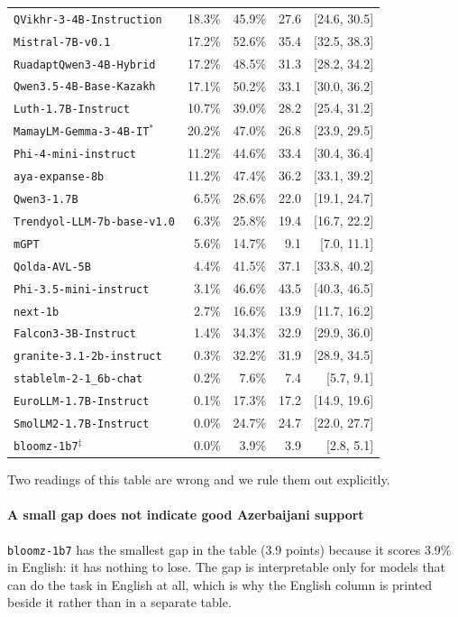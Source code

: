 \documentclass[final]{clv2025}
\begin{document}
\begin{table}[h!]
\begin{tabular}{lrrrr}
\texttt{QVikhr-3-4B-Instruction} & 18.3\% & 45.9\% & 27.6 & [24.6, 30.5] \\
\texttt{Mistral-7B-v0.1} & 17.2\% & 52.6\% & 35.4 & [32.5, 38.3] \\
\texttt{RuadaptQwen3-4B-Hybrid} & 17.2\% & 48.5\% & 31.3 & [28.2, 34.2] \\
\texttt{Qwen3.5-4B-Base-Kazakh} & 17.1\% & 50.2\% & 33.1 & [30.0, 36.2] \\
\texttt{Luth-1.7B-Instruct} & 10.7\% & 39.0\% & 28.2 & [25.4, 31.2] \\
\texttt{MamayLM-Gemma-3-4B-IT}$^{*}$ & 20.2\% & 47.0\% & 26.8 & [23.9, 29.5] \\
\texttt{Phi-4-mini-instruct} & 11.2\% & 44.6\% & 33.4 & [30.4, 36.4] \\
\texttt{aya-expanse-8b} & 11.2\% & 47.4\% & 36.2 & [33.1, 39.2] \\
\texttt{Qwen3-1.7B} & 6.5\% & 28.6\% & 22.0 & [19.1, 24.7] \\
\texttt{Trendyol-LLM-7b-base-v1.0} & 6.3\% & 25.8\% & 19.4 & [16.7, 22.2] \\
\texttt{mGPT} & 5.6\% & 14.7\% & 9.1 & [7.0, 11.1] \\
\texttt{Qolda-AVL-5B} & 4.4\% & 41.5\% & 37.1 & [33.8, 40.2] \\
\texttt{Phi-3.5-mini-instruct} & 3.1\% & 46.6\% & 43.5 & [40.3, 46.5] \\
\texttt{next-1b} & 2.7\% & 16.6\% & 13.9 & [11.7, 16.2] \\
\texttt{Falcon3-3B-Instruct} & 1.4\% & 34.3\% & 32.9 & [29.9, 36.0] \\
\texttt{granite-3.1-2b-instruct} & 0.3\% & 32.2\% & 31.9 & [28.9, 34.5] \\
\texttt{stablelm-2-1\_6b-chat} & 0.2\% & 7.6\% & 7.4 & [5.7, 9.1] \\
\texttt{EuroLLM-1.7B-Instruct} & 0.1\% & 17.3\% & 17.2 & [14.9, 19.6] \\
\texttt{SmolLM2-1.7B-Instruct} & 0.0\% & 24.7\% & 24.7 & [22.0, 27.7] \\
\texttt{bloomz-1b7}$^{\ddagger}$ & 0.0\% & 3.9\% & 3.9 & [2.8, 5.1] \\
\bottomrule
\end{tabular}
\end{table}

Two readings of this table are wrong and we rule them out explicitly.

\paragraph{A small gap does not indicate good Azerbaijani support}
\texttt{bloomz-1b7} has the smallest gap in the table (3.9 points) because it
scores 3.9\% in English: it has nothing to lose. The gap is interpretable only
for models that can do the task in English at all, which is why the English
column is printed beside it rather than in a separate table.
\end{document}
